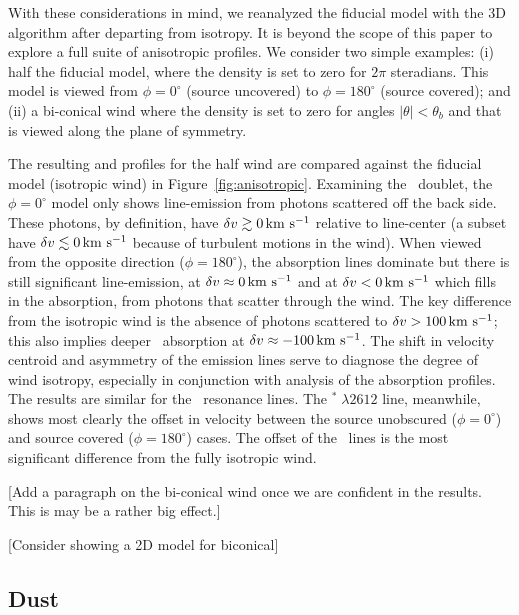 \documentclass[12pt,preprint]{aastex}
\begin{document}
With these considerations in mind, we reanalyzed the fiducial model
with the 3D algorithm after departing from isotropy.  It is beyond the
scope of this paper to explore a full suite of anisotropic profiles.
We consider two simple examples: (i) half the fiducial model, where 
the density is set to zero for $2\pi$ steradians.  This model is
viewed from $\phi = 0^\circ$ (source uncovered) 
to $\phi = 180^\circ$ (source covered); and 
(ii) a bi-conical wind where the density is set to zero for angles
$|\theta| < \theta_b$ and that is viewed along the plane of symmetry.

The resulting  and
 profiles for the half wind are compared against the fiducial model
(isotropic wind) in Figure~\ref{fig:anisotropic}.  
Examining the \mgiid\ doublet, 
the $\phi = 0^\circ$ model only shows
line-emission from photons scattered
off the back side.  These photons, by definition, have $\delta v \gtrsim 0 \, {\rm km~s^{-1}}$
relative to line-center (a subset have $\delta v \lesssim 0 \, {\rm km~s^{-1}}$ because
of turbulent motions in the wind). 
When viewed from the opposite direction ($\phi = 180^\circ$), the
absorption lines dominate but there is still significant
line-emission, at $\delta v \approx 0 \, {\rm km~s^{-1}}$ and at $\delta v < 0 \, {\rm km~s^{-1}}$ which fills
in the absorption, from photons that scatter through the wind.  The
key difference from the isotropic wind is the absence of photons
scattered to $\delta v > 100 \, {\rm km~s^{-1}}$;  this also implies deeper 
\mgiib\ absorption at $\delta v \approx -100 \, {\rm km~s^{-1}}$. The 
shift in velocity centroid and asymmetry of the emission lines
serve to diagnose the degree of wind isotropy, especially in
conjunction with analysis of the absorption profiles. 
The results are similar for the \feiid\ resonance lines.  The
$^* \; \lambda 2612$ line, meanwhile, shows most clearly the
offset in velocity between the source unobscured ($\phi = 0^\circ$)
and source covered ($\phi = 180^\circ$) cases.  The offset of the
\feiis\ lines is the most significant 
difference from the fully isotropic wind.

[Add a paragraph on the bi-conical wind once we are confident in the
results.  This is may be a rather big effect.]

[Consider showing a 2D model for biconical]

\subsection{Dust}
\label{sec:dust}
\end{document}
